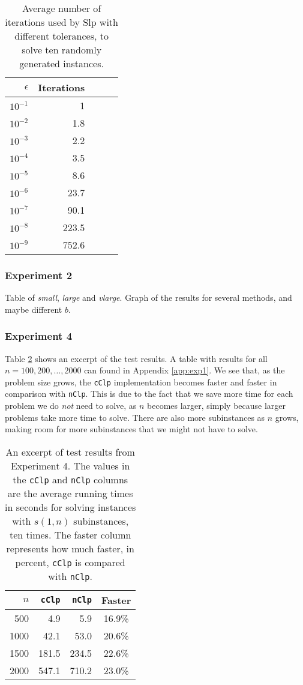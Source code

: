 \begin{table}[ht!]
\centering
\caption{Average number of iterations used by Slp with different tolerances,
         to solve ten randomly generated instances.}
\label{table:expiters}
\begin{tabular}{rrrrr}
$\epsilon$ & Iterations \\ \hline
$10^{-1}$  & 1 \\
$10^{-2}$  & 1.8 \\
$10^{-3}$  & 2.2 \\
$10^{-4}$  & 3.5 \\
$10^{-5}$  & 8.6 \\
$10^{-6}$  & 23.7 \\
$10^{-7}$  & 90.1 \\
$10^{-8}$  & 223.5 \\
$10^{-9}$  & 752.6
\end{tabular}
\end{table}

\subsubsection{Experiment 2}
Table of \textit{small}, \textit{large} and \textit{vlarge}.
Graph of the results for several methods, and maybe different $b$.

\subsubsection{Experiment 4}
Table \ref{table:expfour} shows an excerpt of the test results.
A table with results for all $n=100,200,\ldots,2000$ can found in Appendix
\ref{app:exp1}.
We see that, as the problem size grows, the \texttt{cClp}
implementation becomes faster and faster in comparison with
\texttt{nClp}.
This is due to the fact that we save more time for each problem we do
\emph{not} need to solve, as $n$ becomes larger, simply because larger problems
take more time to solve.
There are also more subinstances as
$n$ grows, making room for more subinstances that we might not have to solve.

\begin{table}[ht!]
    \centering
    \caption{An excerpt of test results from Experiment 4.
             The values in the \texttt{cClp} and \texttt{nClp} columns are the
             average running times in seconds for solving instances with
             $s(1, n)$ subinstances, ten times.
             The faster column represents how much faster, in percent,
             \texttt{cClp} is compared with \texttt{nClp}.}
    \label{table:expfour}
\begin{tabular}{rrrc}
    $n$ & \texttt{cClp}  & \texttt{nClp}  & Faster \\ \hline
    500 & 4.9   & 5.9   & 16.9\% \\
   1000 & 42.1  & 53.0  & 20.6\% \\
   1500 & 181.5 & 234.5 & 22.6\% \\
   2000 & 547.1 & 710.2 & 23.0\%
\end{tabular}
\end{table}

